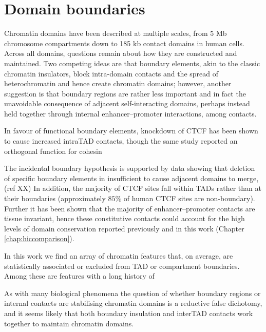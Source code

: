 \documentclass[a4paper,10pt,oneside]{book}
\begin{document}
\section{Domain boundaries}

Chromatin domains have been described at multiple scales, from 5 Mb chromosome compartments\cite{Lieberman2009} down to 185 kb contact domains\cite{Rao2014} in human cells. Across all domains, questions remain about how they are constructed and maintained. Two competing ideas are that boundary elements, akin to the classic chromatin insulators, block intra-domain contacts and the spread of heterochromatin and hence create chromatin domains; however, another suggestion is that boundary regions are rather less important and in fact the unavoidable consequence of adjacent self-interacting domains, perhaps instead held together through internal enhancer--promoter interactions, among contacts.  

In favour of functional boundary elements, knockdown of CTCF has been shown to cause increased intraTAD contacts,\cite{Zuin2013} though the same study reported an orthogonal function for cohesin

The incidental boundary hypothesis is supported by data showing that deletion of specific boundary elements in insufficient to cause adjacent domains to merge,(ref XX) In addition, the majority of CTCF sites fall within TADs rather than at their boundaries (approximately $85\%$ of human CTCF sites are non-boundary\cite{Dixon2012}). Further it has been shown that the majority of enhancer--promoter contacts are tissue invariant,\cite{Bouwman2015a} hence these constitutive contacts could account for the high levels of domain conservation reported previously\cite{Lieberman2009, Dixon2012, Chambers2013, Rao2014} and in this work (Chapter \ref{chap:hiccomparison}).

In this work we find an array of chromatin features that, on average, are statistically associated or excluded from TAD or compartment boundaries. Among these are features with a long history of 


As with many biological phenomena the question of whether boundary regions or internal contacts are stabilising chromatin domains is a reductive false dichotomy, and it seems likely that both boundary insulation and interTAD contacts work together to maintain chromatin domains.
\end{document}
